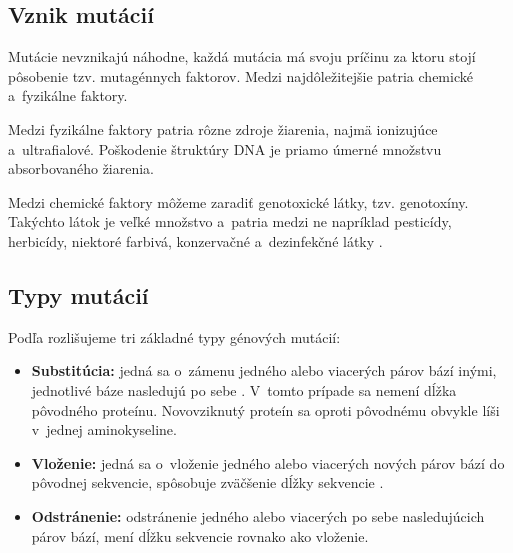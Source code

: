 \subsection{Vznik mutácií}

Mutácie nevznikajú náhodne, každá mutácia má svoju príčinu za ktoru stojí pôsobenie tzv. mutagénnych faktorov. Medzi najdôležitejšie patria chemické a~fyzikálne faktory.

Medzi fyzikálne faktory patria rôzne zdroje žiarenia, najmä ionizujúce a~ultrafialové. Poškodenie štruktúry DNA je priamo úmerné množstvu absorbovaného žiarenia.

Medzi chemické faktory môžeme zaradiť genotoxické látky, tzv. genotoxíny. Takýchto látok je veľké množstvo a~patria medzi ne napríklad pesticídy, herbicídy, niektoré farbivá, konzervačné a~dezinfekčné látky \cite{mutace}. 

\subsection{Typy mutácií}

Podľa \cite{flegr} rozlišujeme tri základné typy génových mutácií:
\begin{itemize}
	\item \textbf{Substitúcia:} jedná sa o~zámenu jedného alebo viacerých párov bází inými, jednotlivé báze nasledujú po sebe \cite{mutace}. V~tomto prípade sa nemení dĺžka pôvodného proteínu. Novovziknutý proteín sa oproti pôvodnému obvykle líši v~jednej aminokyseline.
	\item \textbf{Vloženie:} jedná sa o~vloženie jedného alebo viacerých nových párov bází do pôvodnej sekvencie, spôsobuje zväčšenie dĺžky sekvencie \cite{mutace}.
	\item \textbf{Odstránenie:} odstránenie jedného alebo viacerých po sebe nasledujúcich párov bází, mení dĺžku sekvencie rovnako ako vloženie.
\end{itemize}


